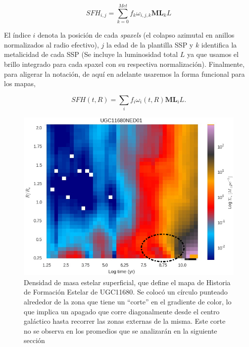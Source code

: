 \begin{equation}
SFH_{i,j}= \sum _{k=0}^{Met} f_{k} \omega_{i,j,k} \mathbf{ML}_{k} L
\end{equation}

\noindent El índice $i$ denota la posición de cada \textsl{spaxels} (el colapso azimutal en anillos normalizados al radio efectivo), $j$ la edad de la plantilla SSP y  $k$ identifica la metalicidad de cada SSP (Se incluye la luminosidad total $L$ ya que usamos el brillo integrado para cada spaxel con su respectiva normalización). Finalmente, para aligerar la notación, de aquí en adelante usaremos la forma funcional para los mapas,

\begin{equation}
SFH(t,R)= \sum _{i} f_{i} \omega_{i}(t,R) \mathbf{ML}_{i} L.
\end{equation}



\begin{figure}
  \centering
    \includegraphics[scale=0.5]{figure_1.png}
  \caption[Densidad de masa estelar superficial, que define el mapa de Historia de Formación Estelar de UGC11680]{Densidad de masa estelar superficial, que define el mapa de Historia de Formación Estelar  de UGC11680. Se colocó un círculo punteado alrededor de la zona que tiene un ``corte'' en el gradiente de color, lo que implica un apagado que corre diagonalmente desde el centro galáctico hasta recorrer las zonas externas de la misma. Este corte no se observa en los promedios que se analizarán en la siguiente sección}
  \label{sfh_ugc11680}
\end{figure}


